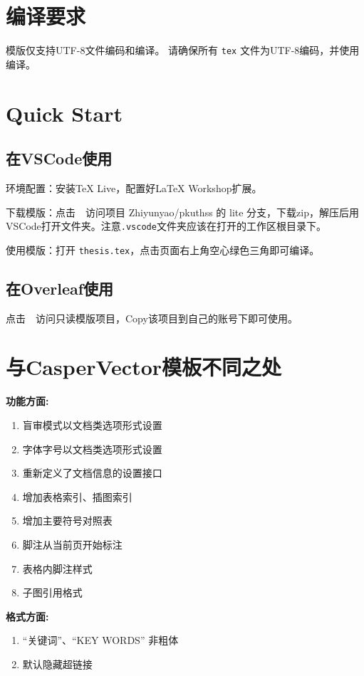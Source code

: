 \section{编译要求}
\pkuthss{}模版仅支持UTF-8文件编码和编译。
请确保所有 \verb|tex| 文件为UTF-8编码，并使用编译。

\section{Quick Start}

\subsection{在VSCode使用}
环境配置：安装TeX Live，配置好LaTeX Workshop扩展。

下载模版：点击\ \GitHubLink\ 访问项目 Zhiyunyao/pkuthss 的 lite 分支，下载zip，解压后用VSCode打开文件夹。注意\verb|.vscode|文件夹应该在打开的工作区根目录下。

使用模版：打开 \verb|thesis.tex|，点击页面右上角空心绿色三角即可编译。

\subsection{在Overleaf使用}
点击\ \OverleafLink\ 访问只读模版项目，Copy该项目到自己的账号下即可使用。

\section{与CasperVector模板不同之处}

\textbf{功能方面:}

\begin{enumerate}[leftmargin=5em]
    \item 盲审模式以文档类选项形式设置
    \item 字体字号以文档类选项形式设置
    \item 重新定义了文档信息的设置接口
    \item 增加表格索引、插图索引
    \item 增加主要符号对照表
    \item 脚注从当前页开始标注
    \item 表格内脚注样式
    \item 子图引用格式
\end{enumerate}

\textbf{格式方面:}

\begin{enumerate}[leftmargin=5em]
    \item ``关键词”、``KEY WORDS” 非粗体 
    \item 默认隐藏超链接
\end{enumerate}
